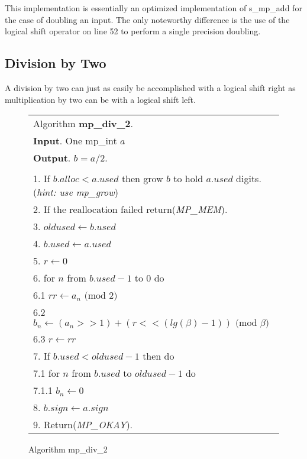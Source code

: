 \documentclass[b5paper]{book}
\begin{document}
This implementation is essentially an optimized implementation of s\_mp\_add for the case of doubling an input.  The only noteworthy difference
is the use of the logical shift operator on line 52 to perform a single precision doubling.  

\subsection{Division by Two}
A division by two can just as easily be accomplished with a logical shift right as multiplication by two can be with a logical shift left.

\newpage\begin{figure}[!here]
\begin{small}
\begin{center}
\begin{tabular}{l}
\hline Algorithm \textbf{mp\_div\_2}. \\
\textbf{Input}.   One mp\_int $a$ \\
\textbf{Output}.  $b = a/2$. \\
\hline \\
1.  If $b.alloc < a.used$ then grow $b$ to hold $a.used$ digits.  (\textit{hint: use mp\_grow}) \\
2.  If the reallocation failed return(\textit{MP\_MEM}). \\
3.  $oldused \leftarrow b.used$ \\
4.  $b.used \leftarrow a.used$ \\
5.  $r \leftarrow 0$ \\
6.  for $n$ from $b.used - 1$ to $0$ do \\
\hspace{3mm}6.1  $rr \leftarrow a_n \mbox{ (mod }2\mbox{)}$\\
\hspace{3mm}6.2  $b_n \leftarrow (a_n >> 1) + (r << (lg(\beta) - 1)) \mbox{ (mod }\beta\mbox{)}$ \\
\hspace{3mm}6.3  $r \leftarrow rr$ \\
7.  If $b.used < oldused - 1$ then do \\
\hspace{3mm}7.1  for $n$ from $b.used$ to $oldused - 1$ do \\
\hspace{6mm}7.1.1  $b_n \leftarrow 0$ \\
8.  $b.sign \leftarrow a.sign$ \\
9.  Return(\textit{MP\_OKAY}).\\
\hline
\end{tabular}
\end{center}
\end{small}
\caption{Algorithm mp\_div\_2}
\end{figure}
\end{document}
